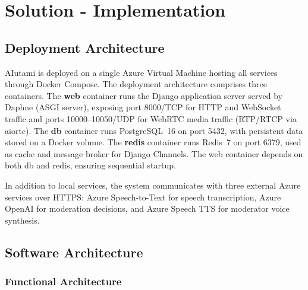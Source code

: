 \chapter{Solution - Implementation}

\section{Deployment Architecture}

AIutami is deployed on a single Azure Virtual Machine hosting all services through Docker Compose. The deployment architecture comprises three containers. The \textbf{web} container runs the Django application server served by Daphne (ASGI server), exposing port 8000/TCP for HTTP and WebSocket traffic and ports 10000--10050/UDP for WebRTC media traffic (RTP/RTCP via aiortc). The \textbf{db} container runs PostgreSQL~16 on port 5432, with persistent data stored on a Docker volume. The \textbf{redis} container runs Redis~7 on port 6379, used as cache and message broker for Django Channels. The web container depends on both db and redis, ensuring sequential startup.

In addition to local services, the system communicates with three external Azure services over HTTPS: Azure Speech-to-Text for speech transcription, Azure OpenAI for moderation decisions, and Azure Speech TTS for moderator voice synthesis.



\section{Software Architecture}

\subsection{Functional Architecture}

